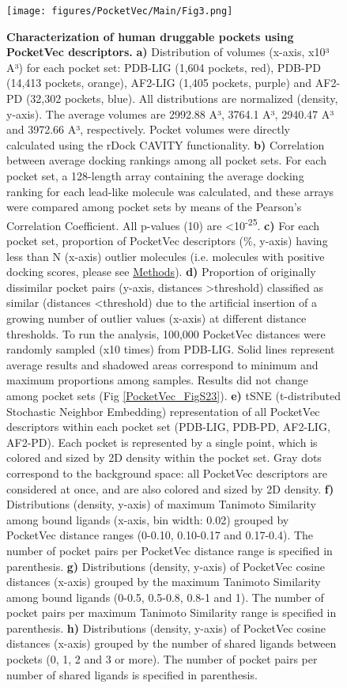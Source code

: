\begin{figure}[htbp]
  \centering
  \texttt{[image: figures/PocketVec/Main/Fig3.png]}
  \caption{
    \textbf{Characterization of human druggable pockets using PocketVec descriptors.} 
    \textbf{a)} Distribution of volumes (x-axis, x10³ A³) for each pocket set: PDB-LIG (1,604 pockets, red), PDB-PD (14,413 pockets, orange), AF2-LIG (1,405 pockets, purple) and AF2-PD (32,302 pockets, blue). All distributions are normalized (density, y-axis). The average volumes are 2992.88 A³, 3764.1 A³, 2940.47 A³ and 3972.66 A³, respectively. Pocket volumes were directly calculated using the rDock\cite{ruiz-carmona_rdock_2014} CAVITY functionality. 
    \textbf{b)} Correlation between average docking rankings among all pocket sets. For each pocket set, a 128-length array containing the average docking ranking for each lead-like molecule was calculated, and these arrays were compared among pocket sets by means of the Pearson’s Correlation Coefficient. All p-values (10) are <10\textsuperscript{-25}. 
    \textbf{c)} For each pocket set, proportion of PocketVec descriptors (\%, y-axis) having less than N (x-axis) outlier molecules (i.e. molecules with positive docking scores, please see \hyperref[PocketVec_Methods]{Methods}).
    \textbf{d)} Proportion of originally dissimilar pocket pairs (y-axis, distances >threshold) classified as similar (distances <threshold) due to the artificial insertion of a growing number of outlier values (x-axis) at different distance thresholds. To run the analysis, 100,000 PocketVec distances were randomly sampled (x10 times) from PDB-LIG. Solid lines represent average results and shadowed areas correspond to minimum and maximum proportions among samples. Results did not change among pocket sets (Fig \ref{PocketVec_FigS23}).
    \textbf{e)} tSNE (t-distributed Stochastic Neighbor Embedding) representation of all PocketVec descriptors within each pocket set (PDB-LIG, PDB-PD, AF2-LIG, AF2-PD). Each pocket is represented by a single point, which is colored and sized by 2D density within the pocket set. Gray dots correspond to the background space: all PocketVec descriptors are considered at once, and are also colored and sized by 2D density.
    \textbf{f)} Distributions (density, y-axis) of maximum Tanimoto Similarity among bound ligands (x-axis, bin width: 0.02) grouped by PocketVec distance ranges (0-0.10, 0.10-0.17 and 0.17-0.4). The number of pocket pairs per PocketVec distance range is specified in parenthesis.
    \textbf{g)} Distributions (density, y-axis) of PocketVec cosine distances (x-axis) grouped by the maximum Tanimoto Similarity among bound ligands (0-0.5, 0.5-0.8, 0.8-1 and 1). The number of pocket pairs per maximum Tanimoto Similarity range is specified in parenthesis.
    \textbf{h)} Distributions (density, y-axis) of PocketVec cosine distances (x-axis) grouped by the number of shared ligands between pockets (0, 1, 2 and 3 or more). The number of pocket pairs per number of shared ligands is specified in parenthesis.
  }
  \label{PocketVec_Fig3}
\end{figure}


